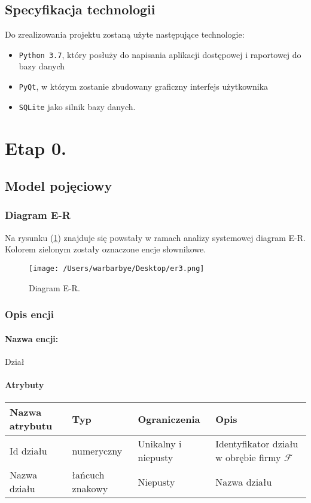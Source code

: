 \documentclass{article}
\begin{document}
\subsection{Specyfikacja technologii}
	Do zrealizowania projektu zostaną użyte następujące technologie:
		\begin{itemize}
			\item \texttt{Python 3.7}, który posłuży do napisania aplikacji dostępowej i raportowej do bazy danych
			\item \texttt{PyQt}, w którym zostanie zbudowany graficzny interfejs użytkownika
			\item \texttt{SQLite} jako silnik bazy danych.
		\end{itemize}
\newpage
\section{Etap 0. \label{s0}}
\subsection{Model pojęciowy}
\subsubsection{Diagram E-R}
Na rysunku (\ref{er1}) znajduje się powstały w ramach analizy systemowej diagram E-R. Kolorem zielonym zostały oznaczone encje słownikowe.
\begin{figure}[H]
			\centering
			\texttt{[image: /Users/warbarbye/Desktop/er3.png]}
			\label{er1}
			\caption{Diagram E-R.}
\end{figure}
\subsubsection{Opis encji}
\paragraph{Nazwa encji:\\ }
Dział
\paragraph{Atrybuty\\ }
\begin{table}[H]
\begin{tabular}{|l|l|l|l|}
\hline
\textbf{Nazwa atrybutu} & \textbf{Typ}    & \textbf{Ograniczenia} & \textbf{Opis}                                      \\ \hline
Id działu               & numeryczny      & Unikalny i niepusty   & Identyfikator działu w obrębie firmy $\mathcal{F}$ \\ \hline
Nazwa działu            & łańcuch znakowy & Niepusty              & Nazwa działu                                       \\ \hline
\end{tabular}
\end{table}
\end{document}
